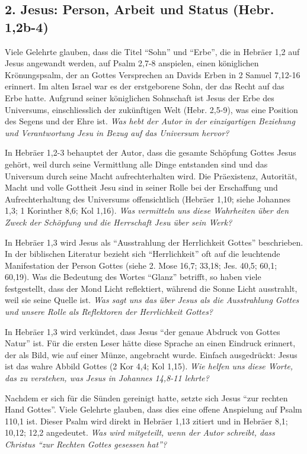 \documentclass[headsepline=true]{book}
\begin{document}
\subsection{2. Jesus: Person, Arbeit und Status (Hebr.
1,2b-4)}\label{jesus-person-arbeit-und-status-hebr.-12b-4}

Viele Gelehrte glauben, dass die Titel ``Sohn'' und ``Erbe'', die in
Hebräer 1,2 auf Jesus angewandt werden, auf Psalm 2,7-8 anspielen, einen
königlichen Krönungspsalm, der an Gottes Versprechen an Davids Erben in
2 Samuel 7,12-16 erinnert. Im alten Israel war es der erstgeborene Sohn,
der das Recht auf das Erbe hatte. Aufgrund seiner königlichen Sohnschaft
ist Jesus der Erbe des Universums, einschliesslich der zukünftigen Welt
(Hebr. 2,5-9), was eine Position des Segens und der Ehre ist. \emph{Was
hebt der Autor in der einzigartigen Beziehung und Verantwortung Jesu in
Bezug auf das Universum hervor?}

In Hebräer 1,2-3 behauptet der Autor, dass die gesamte Schöpfung Gottes
Jesus gehört, weil durch seine Vermittlung alle Dinge entstanden sind
und das Universum durch seine Macht aufrechterhalten wird. Die
Präexistenz, Autorität, Macht und volle Gottheit Jesu sind in seiner
Rolle bei der Erschaffung und Aufrechterhaltung des Universums
offensichtlich (Hebräer 1,10; siehe Johannes 1,3; 1 Korinther 8,6; Kol
1,16). \emph{Was vermitteln uns diese Wahrheiten über den Zweck der
Schöpfung und die Herrschaft Jesu über sein Werk?}

In Hebräer 1,3 wird Jesus als ``Ausstrahlung der Herrlichkeit Gottes''
beschrieben. In der biblischen Literatur bezieht sich ``Herrlichkeit''
oft auf die leuchtende Manifestation der Person Gottes (siehe 2. Mose
16,7; 33,18; Jes. 40,5; 60,1; 60,19). Was die Bedeutung des Wortes
``Glanz'' betrifft, so haben viele festgestellt, dass der Mond Licht
reflektiert, während die Sonne Licht ausstrahlt, weil sie seine Quelle
ist. \emph{Was sagt uns das über Jesus als die Ausstrahlung Gottes und
unsere Rolle als Reflektoren der Herrlichkeit Gottes?}

In Hebräer 1,3 wird verkündet, dass Jesus ``der genaue Abdruck von
Gottes Natur'' ist. Für die ersten Leser hätte diese Sprache an einen
Eindruck erinnert, der als Bild, wie auf einer Münze, angebracht wurde.
Einfach ausgedrückt: Jesus ist das wahre Abbild Gottes (2 Kor 4,4; Kol
1,15). \emph{Wie helfen uns diese Worte, das zu verstehen, was Jesus in
Johannes 14,8-11 lehrte?}

Nachdem er sich für die Sünden gereinigt hatte, setzte sich Jesus ``zur
rechten Hand Gottes''. Viele Gelehrte glauben, dass dies eine offene
Anspielung auf Psalm 110,1 ist. Dieser Psalm wird direkt in Hebräer 1,13
zitiert und in Hebräer 8,1; 10,12; 12,2 angedeutet. \emph{Was wird
mitgeteilt, wenn der Autor schreibt, dass Christus ``zur Rechten Gottes
gesessen hat''?}
\end{document}
